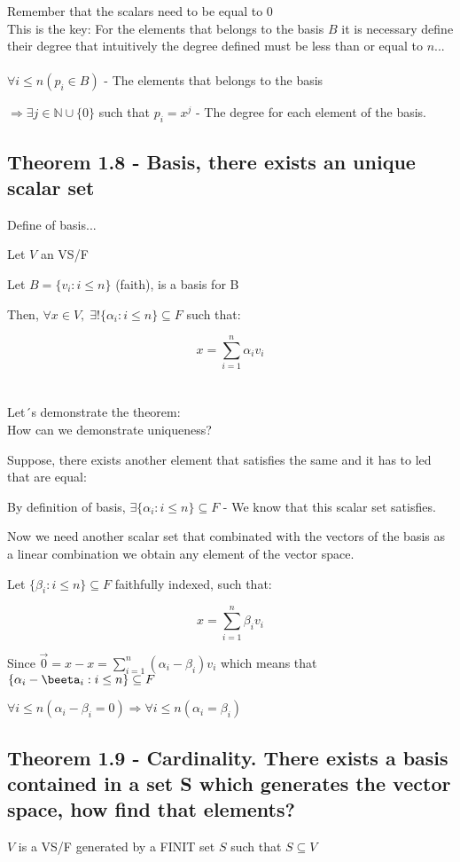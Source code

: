 \documentclass{article}
\begin{document}
Remember that the scalars need to be equal to 0
\\

This is the key: For the elements that belongs to the basis \(B\) it is necessary define their degree that intuitively the degree defined must be less than or equal to \(n\)...
\\
\\
\(\forall i \leq n (p_i \in B)\) - The elements that belongs to the basis 

\(\Rightarrow \exists j \in \mathbb{N}\cup\{0\}\) such that \(p_i = x^j\) - The degree for each element of the basis.



\subsection*{Theorem 1.8 - Basis, there exists an unique scalar set }
Define of basis...

Let \(V\) an VS/F

Let \(B = \{v_i : i \leq n\}\) (faith), is a basis for B

Then, \(\forall x \in V,\;\exists\textbf{!}\{\alpha_i : i \leq n\} \subseteq F\) such that:

\[x = \sum_{i=1}^{n} \alpha_i v_i\]
\\
\\
Let´s demonstrate the theorem:
\\

How can we demonstrate uniqueness?

Suppose, there exists another element that satisfies the same and it has to led that are equal:

By definition of basis, \(\exists \{\alpha_i : i \leq n\} \subseteq F\) - We know that this scalar set satisfies.

Now we need another scalar set that combinated with the vectors of the basis as a linear combination we obtain any element of the vector space.

Let \(\{\beta_i : i \leq n \} \subseteq F\) faithfully indexed, such that:

\[x = \sum_{i=1}^{n} \beta_i v_i\]

Since \(\vec{0} = x-x = \sum_{i=1}^{n} (\alpha_i - \beta_i) v_i\) which means that \(\{\alpha_i - \beeta_i : i\leq n\} \subseteq F\)

\(\forall i \leq n (\alpha_i - \beta_i = 0) \Rightarrow \forall i \leq n  (\alpha_i = \beta_i)\)

\subsection*{Theorem 1.9 - Cardinality. There exists a basis contained in a set S which generates the vector space, how find that elements?}
\(V \) is a VS/F generated by a FINIT set \(S\) such that \(S \subseteq V\)
\end{document}
